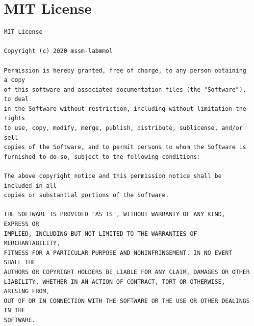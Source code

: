 \documentclass[10pt,a4paper,openany]{memoir}
\numberwithin{equation}{section}
\begin{document}
\appendix
\chapter{MIT License}
\label{appendix:MIT-license}

\begin{verbatim}
MIT License

Copyright (c) 2020 mssm-labmmol

Permission is hereby granted, free of charge, to any person obtaining a copy
of this software and associated documentation files (the "Software"), to deal
in the Software without restriction, including without limitation the rights
to use, copy, modify, merge, publish, distribute, sublicense, and/or sell
copies of the Software, and to permit persons to whom the Software is
furnished to do so, subject to the following conditions:

The above copyright notice and this permission notice shall be included in all
copies or substantial portions of the Software.

THE SOFTWARE IS PROVIDED "AS IS", WITHOUT WARRANTY OF ANY KIND, EXPRESS OR
IMPLIED, INCLUDING BUT NOT LIMITED TO THE WARRANTIES OF MERCHANTABILITY,
FITNESS FOR A PARTICULAR PURPOSE AND NONINFRINGEMENT. IN NO EVENT SHALL THE
AUTHORS OR COPYRIGHT HOLDERS BE LIABLE FOR ANY CLAIM, DAMAGES OR OTHER
LIABILITY, WHETHER IN AN ACTION OF CONTRACT, TORT OR OTHERWISE, ARISING FROM,
OUT OF OR IN CONNECTION WITH THE SOFTWARE OR THE USE OR OTHER DEALINGS IN THE
SOFTWARE.
\end{verbatim}
\end{document}
